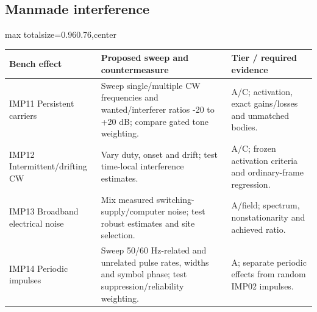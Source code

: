 \documentclass[11pt,a4paper]{article}
\newlength{\tableavail}
\renewcommand{\arraystretch}{1.13}
\begin{document}
\begin{landscape}\thispagestyle{plain}\centering
\subsection{Manmade interference}

\setlength{\tabcolsep}{5pt}\renewcommand{\arraystretch}{1.25}
\setlength{\tableavail}{\dimexpr\linewidth-4\tabcolsep\relax}
\begin{adjustbox}{max totalsize={0.96\linewidth}{0.76\textheight},center}
\begin{tabular}{@{}>{\raggedright\arraybackslash}p{0.23\tableavail}>{\raggedright\arraybackslash}p{0.54\tableavail}>{\raggedright\arraybackslash}p{0.23\tableavail}@{}}
\toprule
\textbf{Bench effect} & \textbf{Proposed sweep and countermeasure} & \textbf{Tier / required evidence}\\
\midrule
IMP11 Persistent carriers & Sweep single/multiple CW frequencies and wanted/interferer ratios -20 to +20 dB; compare gated tone weighting. & A/C; activation, exact gains/losses and unmatched bodies.\\[5pt]
IMP12 Intermittent/drifting CW & Vary duty, onset and drift; test time-local interference estimates. & A/C; frozen activation criteria and ordinary-frame regression.\\[5pt]
IMP13 Broadband electrical noise & Mix measured switching-supply/computer noise; test robust estimates and site selection. & A/field; spectrum, nonstationarity and achieved ratio.\\[5pt]
IMP14 Periodic impulses & Sweep 50/60 Hz-related and unrelated pulse rates, widths and symbol phase; test suppression/reliability weighting. & A; separate periodic effects from random IMP02 impulses.\\[5pt]
\bottomrule
\end{tabular}
\end{adjustbox}
\end{landscape}
\end{document}
